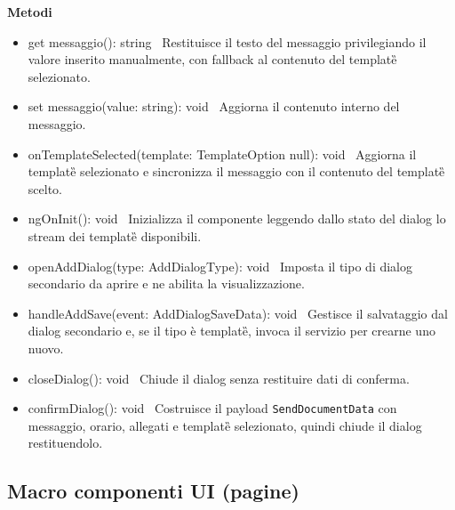 \documentclass[a4paper,11pt]{article}
\begin{document}
\textbf{Metodi}
\begin{itemize}[noitemsep, topsep=0pt]
\item get messaggio(): string \
Restituisce il testo del messaggio privilegiando il valore inserito manualmente, con fallback al contenuto del template\G{} selezionato.

\item set messaggio(value: string): void \
Aggiorna il contenuto interno del messaggio.

\item onTemplateSelected(template: TemplateOption \textbar{} null): void \
Aggiorna il template\G{} selezionato e sincronizza il messaggio con il contenuto del template\G{} scelto.

\item ngOnInit(): void \
Inizializza il componente leggendo dallo stato del dialog lo stream dei template\G{} disponibili.

\item openAddDialog(type: AddDialogType): void \
Imposta il tipo di dialog secondario da aprire e ne abilita la visualizzazione.

\item handleAddSave(event: AddDialogSaveData): void \
Gestisce il salvataggio dal dialog secondario e, se il tipo è template\G{}, invoca il servizio per crearne uno nuovo.

\item closeDialog(): void \
Chiude il dialog senza restituire dati di conferma.

\item confirmDialog(): void \
Costruisce il payload \texttt{SendDocumentData} con messaggio, orario, allegati e template\G{} selezionato, quindi chiude il dialog restituendolo.
\end{itemize}
\subsection{Macro componenti UI (pagine)}
\end{document}
